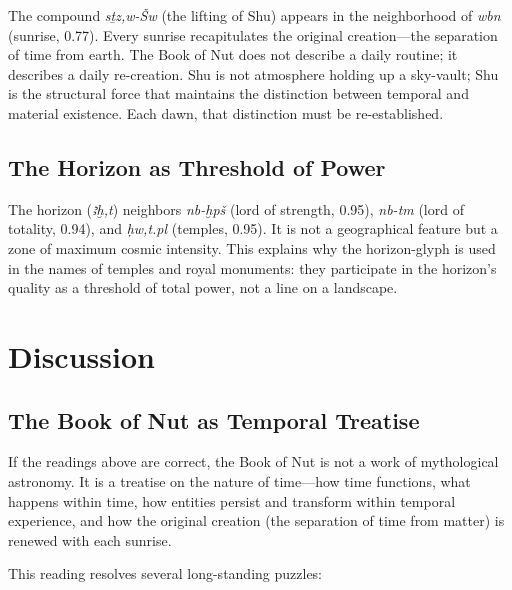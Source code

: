 \documentclass[11pt, a4paper]{article}
\begin{document}
The compound \textit{sṯz,w-Šw} (the lifting of Shu) appears in the neighborhood of \textit{wbn} (sunrise, 0.77). Every sunrise recapitulates the original creation---the separation of time from earth. The Book of Nut does not describe a daily routine; it describes a daily re-creation. Shu is not atmosphere holding up a sky-vault; Shu is the structural force that maintains the distinction between temporal and material existence. Each dawn, that distinction must be re-established.

\subsection{The Horizon as Threshold of Power}

The horizon (\textit{ꜣḫ,t}) neighbors \textit{nb-ḫpš} (lord of strength, 0.95), \textit{nb-tm} (lord of totality, 0.94), and \textit{ḥw,t.pl} (temples, 0.95). It is not a geographical feature but a zone of maximum cosmic intensity. This explains why the horizon-glyph is used in the names of temples and royal monuments: they participate in the horizon's quality as a threshold of total power, not a line on a landscape.

\section{Discussion}
\label{sec:discussion}

\subsection{The Book of Nut as Temporal Treatise}

If the readings above are correct, the Book of Nut is not a work of mythological astronomy. It is a treatise on the nature of time---how time functions, what happens within time, how entities persist and transform within temporal experience, and how the original creation (the separation of time from matter) is renewed with each sunrise.

This reading resolves several long-standing puzzles:
\end{document}
